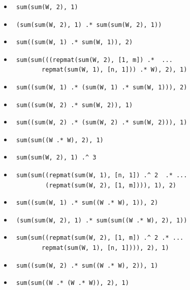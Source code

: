 \documentclass{article}
\begin{document}
\begingroup
    \fontsize{8pt}{12pt}\selectfont
\begin{itemize}
	\itemsep-5px 
	\item \begin{verbatim} sum(sum(W, 2), 1) \end{verbatim}
	\item \begin{verbatim} (sum(sum(W, 2), 1) .* sum(sum(W, 2), 1)) \end{verbatim}
	\item \begin{verbatim} sum((sum(W, 1) .* sum(W, 1)), 2) \end{verbatim}
	\item \begin{verbatim} sum(sum(((repmat(sum(W, 2), [1, m]) .*  ...
		repmat(sum(W, 1), [n, 1])) .* W), 2), 1) \end{verbatim}
	\item \begin{verbatim} sum((sum(W, 1) .* (sum(W, 1) .* sum(W, 1))), 2) \end{verbatim}
	\item \begin{verbatim} sum((sum(W, 2) .* sum(W, 2)), 1) \end{verbatim}
	\item \begin{verbatim} sum((sum(W, 2) .* (sum(W, 2) .* sum(W, 2))), 1) \end{verbatim}
	\item \begin{verbatim} sum(sum((W .* W), 2), 1) \end{verbatim}
	\item \begin{verbatim} sum(sum(W, 2), 1) .^ 3 \end{verbatim}
	\item \begin{verbatim} sum(sum((repmat(sum(W, 1), [n, 1]) .^ 2  .* ...
		 (repmat(sum(W, 2), [1, m]))), 1), 2) \end{verbatim}
	\item \begin{verbatim} sum((sum(W, 1) .* sum((W .* W), 1)), 2) \end{verbatim}
	\item \begin{verbatim} (sum(sum(W, 2), 1) .* sum(sum((W .* W), 2), 1)) \end{verbatim}
	\item \begin{verbatim} sum(sum((repmat(sum(W, 2), [1, m]) .^ 2 .* ...
		repmat(sum(W, 1), [n, 1]))), 2), 1) \end{verbatim}
	\item \begin{verbatim} sum((sum(W, 2) .* sum((W .* W), 2)), 1) \end{verbatim}
	\item \begin{verbatim} sum(sum((W .* (W .* W)), 2), 1) \end{verbatim}
\end{itemize}
\endgroup
\end{document}
